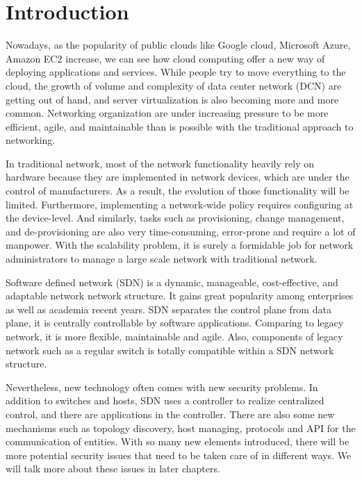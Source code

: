 \chapter{Introduction}
\label{chap:intro}
\setcounter{page}{1}

Nowadays, as the popularity of public clouds like Google cloud, Microsoft Azure, Amazon EC2 increase, we can see how cloud computing offer a new way of deploying applications and services. While people try to move everything to the cloud, the growth of volume and complexity of data center network (DCN) are getting out of hand, and server virtualization is also becoming more and more common. Networking organization are under increasing pressure to be more efficient, agile, and maintainable than is possible with the traditional approach to networking.

In traditional network, most of the network functionality heavily rely on hardware because they are implemented in network devices, which are under the control of manufacturers. As a result, the evolution of those functionality will be limited. Furthermore, implementing a network-wide policy requires configuring at the device-level. And similarly, tasks such as provisioning, change management, and de-provisioning are also very time-consuming, error-prone and require a lot of manpower. With the scalability problem, it is surely a formidable job for network administrators to manage a large scale network with traditional network. 

Software defined network (SDN) is a dynamic, manageable, cost-effective, and adaptable network network structure. It gains great popularity among enterprises as well as academia recent years. SDN separates the control plane from data plane, it is centrally controllable by software applications. Comparing to legacy network, it is more flexible, maintainable and agile. Also, components of legacy network such as a regular switch is totally compatible within a SDN network structure.

Nevertheless, new technology often comes with new security problems. In addition to switches and hosts, SDN uses a controller to realize centralized control, and there are applications in the controller. There are also some new mechanisms such as topology discovery, host managing, protocols and API for the communication of entities. With so many new elements introduced, there will be more potential security issues that need to be taken care of in different ways. We will talk more about these issues in later chapters.

